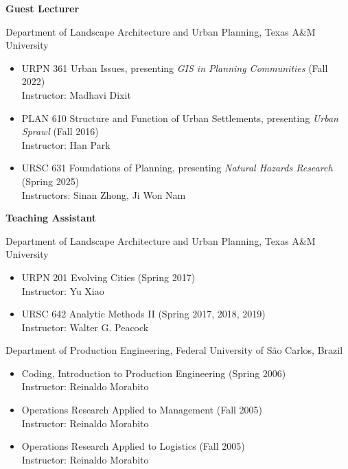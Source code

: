 \documentclass[11pt,oneside]{article}
\begin{document}
\newpage
\pagestyle{main}

\textbf{Guest Lecturer}

\vspace{1pt}

{Department of Landscape Architecture and Urban Planning, Texas A\&M University}
\begin{itemize}[leftmargin=20pt]
\item URPN 361 Urban Issues, presenting \emph{GIS in Planning Communities} (Fall 2022)\\
      Instructor: Madhavi Dixit
\item PLAN 610 Structure and Function of Urban Settlements, presenting \emph{Urban Sprawl} (Fall 2016)\\
      Instructor: Han Park
\item URSC 631 Foundations of Planning, presenting \emph{Natural Hazards Research} (Spring 2025)\\
      Instructors: Sinan Zhong, Ji Won Nam
\end{itemize}

\vspace{1pt}

\textbf{Teaching Assistant}

\vspace{1pt}

{Department of Landscape Architecture and Urban Planning, Texas A\&M University}
\begin{itemize}[leftmargin=20pt]
\item URPN 201 Evolving Cities (Spring 2017)\\
      Instructor: Yu Xiao
\item URSC 642 Analytic Methods II (Spring 2017, 2018, 2019)\\
      Instructor: Walter G. Peacock
\end{itemize}

\vspace{1pt}

{Department of Production Engineering, Federal University of São Carlos, Brazil}
\begin{itemize}[leftmargin=20pt]
\item Coding, Introduction to Production Engineering (Spring 2006)\\
      Instructor: Reinaldo Morabito
\item Operations Research Applied to Management (Fall 2005)\\
      Instructor: Reinaldo Morabito
\item Operations Research Applied to Logistics (Fall 2005)\\
      Instructor: Reinaldo Morabito
\end{itemize}
\end{document}
